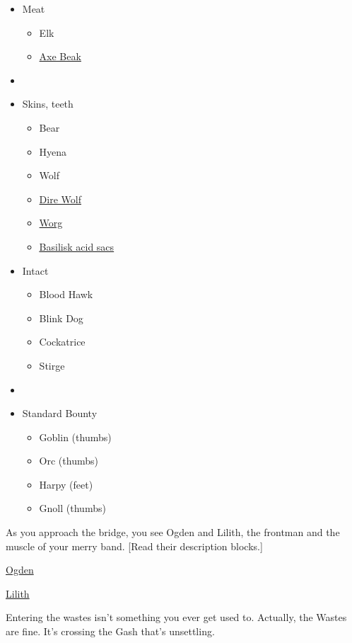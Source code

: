 \begin{multicols}{2}
  \newpage
  \begin{itemize}
    \item[] Meat
    \begin{itemize}
      \item Elk
      \item \underline{Axe Beak}
    \end{itemize}
    \item[]
    \item[] Skins, teeth
    \begin{itemize}
      \item Bear
      \item Hyena
      \item Wolf
      \item \underline{Dire Wolf}
      \item \underline{Worg}
      \item \underline{\underline{{Basilisk acid sacs}}}
    \end{itemize}
  \end{itemize}
  \vfill\null
  \columnbreak
  \begin{itemize}
    \item[] Intact
    \begin{itemize}
      \item Blood Hawk
      \item Blink Dog
      \item Cockatrice
      \item Stirge
    \end{itemize}
    \item[]
    \item[] Standard Bounty
    \begin{itemize}
      \item Goblin (thumbs)
      \item Orc (thumbs)
      \item Harpy (feet)
      \item Gnoll (thumbs)
    \end{itemize}
  \end{itemize}

  \newpage

  As you approach the bridge, you see Ogden and Lilith, the frontman and the muscle
    of your merry band.
  [Read their description blocks.]

  \hyperref[subsec:ogden]{Ogden}

  \hyperref[subsec:alotel]{Lilith}

  Entering the wastes isn't something you ever get used to.
  Actually, the Wastes are fine.
  It's crossing the Gash that's unsettling.


\end{multicols}
